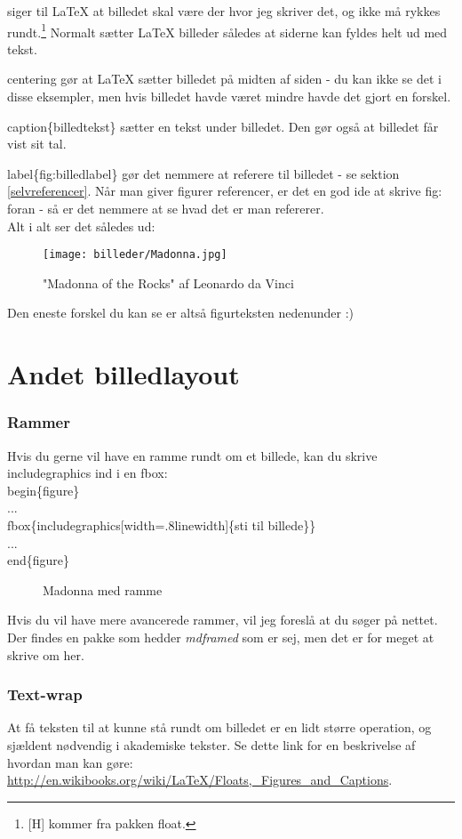 \noindent
[H] siger til LaTeX at billedet skal være der hvor jeg skriver det, og ikke må rykkes rundt.\footnote{[H] kommer fra pakken float.} Normalt sætter LaTeX billeder således at siderne kan fyldes helt ud med tekst.

\noindent
\bs centering gør at LaTeX sætter billedet på midten af siden - du kan ikke se det i disse eksempler, men hvis billedet havde været mindre havde det gjort en forskel.

\noindent
\bs caption\{billedtekst\} sætter en tekst under billedet. Den gør også at billedet får vist sit tal.

\noindent
\bs label\{fig:billedlabel\} gør det nemmere at referere til billedet - se sektion  \ref{selvreferencer}. Når man giver figurer referencer, er det en god ide at skrive fig: foran - så er det nemmere at se hvad det er man refererer.\\

\noindent
Alt i alt ser det således ud:

\begin{figure}[H]
\centering
\texttt{[image: billeder/Madonna.jpg]}
\caption{"Madonna of the Rocks" af Leonardo da Vinci}
\label{fig:madonna_standard}
\end{figure}

\noindent
Den eneste forskel du kan se er altså figurteksten nedenunder :)

\section{Andet billedlayout}
\subsubsection{Rammer}
Hvis du gerne vil have en ramme rundt om et billede, kan du skrive \bs includegraphics ind i en \bs fbox:\\

\indent \bs begin\{figure\}\\
\indent ... \\
\indent \bs fbox\{\bs includegraphics[width=.8\bs linewidth]\{sti til billede\}\}\\
\indent ... \\
\indent \bs end\{figure\}\\

\begin{figure}[H]
\centering
{}
\caption{Madonna med ramme}
\label{fig:madonna_ramme}
\end{figure}

\noindent
Hvis du vil have mere avancerede rammer, vil jeg foreslå at du søger på nettet. Der findes en pakke som hedder \emph{mdframed} som er sej, men det er for meget at skrive om her.

\subsubsection{Text-wrap}
At få teksten til at kunne stå rundt om billedet er en lidt større operation, og sjældent nødvendig i akademiske tekster. Se dette link for en beskrivelse af hvordan man kan gøre: \url{http://en.wikibooks.org/wiki/LaTeX/Floats,_Figures_and_Captions}.